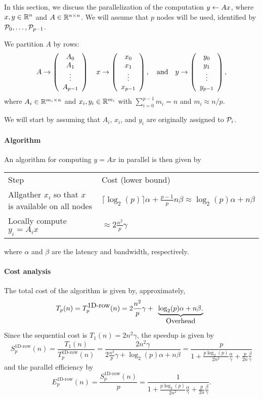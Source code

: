 

In this section, we discuss the parallelization of the
computation $ y \leftarrow A x $, where $ x, y \in \mathbb{R}^{n} $ and $ A \in \mathbb{R}^{n \times n} $.
We will assume that $ p $ nodes will be used, identified by $ {\cal P}_0, 
\ldots , {\cal P}_{p-1} $.

We partition $A$ by rows:
\[
A \rightarrow \left( \begin{array}{c} A_0 \\ A_1 \\ \vdots \\ A_{p-1} \end{array} \right) 
\quad
x \rightarrow \left( \begin{array}{c} x_0 \\ x_1 \\ \vdots \\ x_{p-1} \end{array} \right) ,
\quad
\mbox{and}
\quad
y \rightarrow \left( \begin{array}{c} y_0 \\ y_1 \\ \vdots \\ y_{p-1} \end{array} \right) ,
\]
where $ A_i \in \mathbb{R}^{m_i \times n} $ and $ x_i, y_i \in \mathbb{R}^{m_i} $ with
$ \sum_{i=0}^{p-1} m_i = n $ and $ m_i \approx n / p $.

We will start by assuming
that $ A_i $, $ x_i $, and $ y_i $ are originally assigned to $ {\cal P}_i $.

\paragraph*{Algorithm}

An algorithm for computing $ y = A x $ in parallel is then given by
\\[0.1in]
\begin{center}
\begin{tabular}{| p{3.5in} |  p{3.0in} |}\hline
Step & Cost (lower bound) \\ \whline
Allgather $ x_i $ so that $ x $ is available on all nodes & 
$ \lceil \log_2(p)\rceil \alpha + \frac{p-1}{p} n \beta \approx
\log_2(p) \alpha + n \beta $ \\
Locally compute $ y_i = A_i x $ &
$ \approx 2 \frac{n^2}{p} \gamma $ \\ \hline
\end{tabular}
\end{center}
where $\alpha$ and $\beta$ are the latency and bandwidth,
respectively.

\paragraph*{Cost analysis}

The total cost of the algorithm is given by, approximately,
\[
T_p(n) = T_p^{\mbox{1D-row}}(n) = 
2 \frac{n^2}{p} \gamma + 
\begin{array}[t]{c}
\underbrace{\log_2(p) \alpha + n \beta.}
\\
\mbox{Overhead}
\end{array}
\]
Since the sequential cost is $ T_1(n) = 2 n^2 \gamma $, the speedup is given by
\[
S_p^{\mbox{1D-row}}(n) = 
\frac{T_1(n)}
{T_p^{\mbox{1D-row}}(n)} = 
\frac{2 n^2 \gamma}
{ 2 \frac{n^2}{p} \gamma + 
\log_2(p) \alpha + n \beta}
= 
\frac{p}
{ 1 + \frac{p \log_2(p)}{2 n^2} \frac{\alpha}{\gamma} 
+ \frac{p}{2 n} \frac{\beta}{\gamma} }
\]
and the parallel efficiency by
\[
E_p^{\mbox{1D-row}}(n) = 
\frac{S_p^{\mbox{1D-row}}(n)}{p}
= 
\frac{1}
{ 1 + \frac{p \log_2(p)}{2 n^2} \frac{\alpha}{\gamma} 
+ \frac{p}{2 n} \frac{\beta}{\gamma} }.
\]


